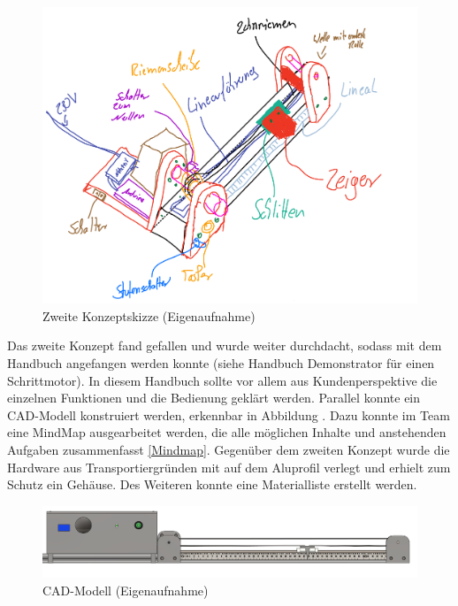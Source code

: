 \begin{figure}[H]
	\begin{center}
		\includegraphics[width=\textwidth]{Images/Konzeptskizze2.png}
		\caption{Zweite Konzeptskizze (Eigenaufnahme)} \label{ZweiteKonzeptskizze}
	\end{center}
\end{figure}

Das zweite Konzept fand gefallen und wurde weiter durchdacht, sodass mit dem Handbuch angefangen werden konnte (siehe Handbuch Demonstrator für einen Schrittmotor). In diesem Handbuch sollte vor allem aus Kundenperspektive die einzelnen Funktionen und die Bedienung geklärt werden. Parallel konnte ein CAD-Modell konstruiert werden, erkennbar in Abbildung . Dazu konnte im Team eine MindMap ausgearbeitet werden, die alle möglichen Inhalte und anstehenden Aufgaben zusammenfasst \ref{Mindmap}. Gegenüber dem zweiten Konzept wurde die Hardware aus Transportiergründen mit auf dem Aluprofil verlegt und erhielt zum Schutz ein Gehäuse. Des Weiteren konnte eine Materialliste erstellt werden. 

\begin{figure}[H]
	\begin{center}
		\includegraphics[width=\textwidth]{Images/Konstruktion1.png}
		\caption{CAD-Modell (Eigenaufnahme)} \label{CADMOD}
	\end{center}
\end{figure} 

